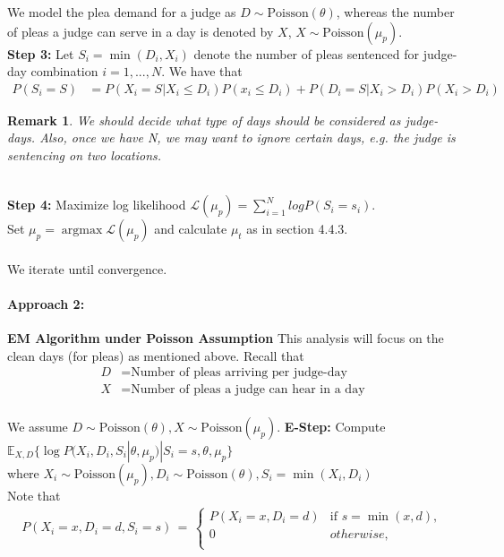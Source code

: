 \documentclass[11pt, oneside]{article}   	%
\theoremstyle{ModifiedStyle}
\newtheorem{remark}{Remark}
\DeclareMathOperator*{\argmax}{argmax}
\begin{document}
We model the plea demand for a judge as $D \sim \text{Poisson}(\theta)$, whereas the number of pleas a judge can serve in a day is denoted by $X$, $X \sim \text{Poisson}(\mu_p)$.\\

\textbf{Step 3:} Let $S_i = \min(D_i,X_i)$ denote the number of pleas sentenced for judge-day combination $i=1,...,N$. We have that
\begin{align*}
	P(S_i = S) &= P(X_i = S | X_i \leq D_i) P(x_i \leq D_i) + P(D_i = S | X_i > D_i) P(X_i > D_i)
\end{align*}

\begin{remark}
	We should decide what type of days should be considered as judge-days. Also, once we have N, we may want to ignore certain days, e.g. the judge is sentencing on two locations.
\end{remark} \\

\textbf{Step 4:} Maximize log likelihood $\mathscr{L}(\mu_p) = \sum_{i=1}^N log P(S_i = s_i)$. \\
Set $\mu_p = \argmax \mathscr{L}(\mu_p)$ and calculate $\mu_t$ as in section 4.4.3. \\
\\
We iterate until convergence.

\paragraph{Approach 2:} \textbf{EM Algorithm under Poisson Assumption} This analysis will focus on the clean days (for pleas) as mentioned above. Recall that \begin{align*}
	D &= \text{Number of pleas arriving per judge-day}\\
	X &= \text{Number of pleas a judge can hear in a day}
\end{align*}\\

We assume $D \sim \text{Poisson}(\theta), X \sim \text{Poisson}(\mu_p)$.
\textbf{E-Step:} Compute $\mathbb{E}_{X,D}\{ \log P(X_i,D_i,S_i|\theta,\mu_p)|S_i=s,\theta,\mu_p\}$ \\
where $X_i \sim \text{Poisson}(\mu_p), D_i \sim \text{Poisson}(\theta), S_i = \min(X_i,D_i)$\\
Note that
\begin{align*}
P(X_i=x,D_i=d,S_i=s) \,=\, \left \{\!\! \begin{array}{ll}
P(X_i = x,D_i=d) & \text{if } s= \min(x,d), \\
0 & otherwise, \\
\end{array} \right.
\end{align*}
\end{document}
